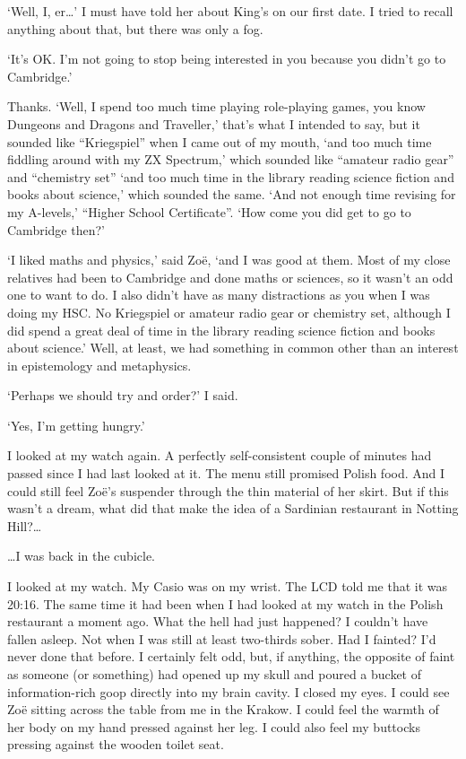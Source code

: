 `Well, I, er\dots' I must have told her about King's on our first date. I tried to recall anything about that, but there was only a fog.

`It's OK. I'm not going to stop being interested in you because you
didn't go to Cambridge.'

Thanks. `Well, I spend too much time playing role-playing games, you know {\twelvesl Dungeons and
Dragons\/} and {\twelvesl Traveller},' that's what I intended to say, but it sounded like
``Kriegspiel'' when I came out of my mouth, `and too much time
fiddling around with my ZX Spectrum,' which sounded like ``amateur radio gear'' and ``chemistry set'' `and too much time in the library reading science fiction and books about science,' which sounded the same. `And not enough time revising for my A-levels,' ``Higher School Certificate''. `How come you {\twelveit did\/} get to go to Cambridge then?'

`I liked maths and physics,' said Zoë, `and I was good at them. Most of my close relatives had been to Cambridge and done maths or sciences, so it wasn't an odd one to want to do. I also didn't have as many distractions as you when I was doing my HSC. No Kriegspiel or amateur radio gear or chemistry set, although I did spend a great deal of time in the library reading science fiction and books about science.' Well, at least, we had something in common other than an interest in epistemology and metaphysics.

`Perhaps we should try and order?' I said.

`Yes, I'm getting hungry.'

I looked at my watch again. A perfectly self-consistent couple of minutes had passed since I had last looked at it. The menu still promised Polish food. And I could still feel Zoë's suspender through the thin material of her skirt.
But if this wasn't a dream, what did that make the idea of a Sardinian restaurant in Notting Hill?\dots

\majorbreak
{\dots}I was back in the cubicle.

I looked at my watch. My Casio was on my wrist. The LCD told me that it was 20:16. The same time it had been when I had looked at my watch in the Polish restaurant a moment ago. What the hell had just happened? I couldn't have fallen asleep. Not when I was
still at least two-thirds sober. Had I fainted? I'd
never done that before. I certainly felt odd, but, if anything, the
opposite of faint as someone (or something) had opened up my skull
and poured a bucket of information-rich goop directly into my brain
cavity. I closed my eyes. I could see Zoë sitting across the table from me in the Krakow. I could feel the warmth of her body on my hand pressed against her leg. I could also feel my buttocks
pressing against the wooden toilet seat.


